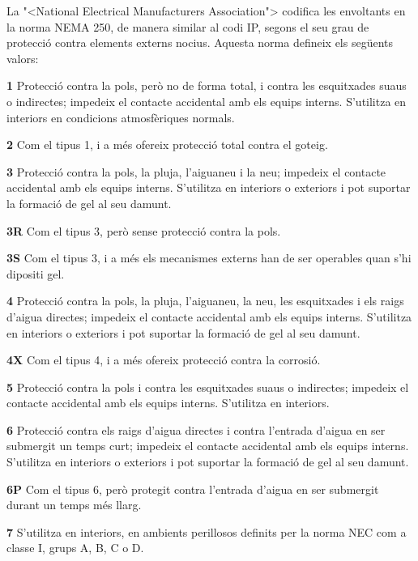 La {"<}National Electrical Manufacturers Association{">}
codifica les envoltants en la norma \textsf{NEMA 250}, de manera similar al codi \textsf{IP}, segons el seu grau de protecci\'{o} contra elements externs nocius. Aquesta norma defineix els seg\"{u}ents valors:
\begin{list}{}
   {\setlength{\labelwidth}{10mm} \setlength{\leftmargin}{10mm} \setlength{\labelsep}{2mm}}
   \item[\textbf{1}] Protecci\'{o} contra la pols, per\`{o} no de forma total, i contra les esquitxades suaus o indirectes; impedeix el contacte accidental amb els equips interns. S'utilitza en interiors en condicions atmosf\`{e}riques normals.
   \item[\textbf{2}] Com el tipus 1, i a m\'{e}s ofereix protecci\'{o} total contra el goteig.
   \item[\textbf{3}] Protecci\'{o} contra la pols, la pluja, l'aiguaneu i la neu; impedeix el contacte accidental amb els equips interns. S'utilitza en interiors o exteriors i pot suportar la formaci\'{o} de gel al seu damunt.
   \item[\textbf{3R}] Com el tipus 3, per\`{o} sense protecci\'{o} contra la pols.
   \item[\textbf{3S}] Com el tipus 3, i a m\'{e}s els mecanismes externs han de ser operables quan s'hi dipositi gel.
    \item[\textbf{4}] Protecci\'{o} contra la pols, la pluja, l'aiguaneu, la neu, les esquitxades i els raigs d'aigua directes; impedeix el contacte accidental amb els equips interns. S'utilitza en interiors o exteriors i pot suportar la formaci\'{o} de gel al seu damunt.
   \item[\textbf{4X}] Com el tipus 4, i a m\'{e}s ofereix protecci\'{o} contra la corrosi\'{o}.
   \item[\textbf{5}] Protecci\'{o} contra la pols i contra les esquitxades suaus o indirectes; impedeix el contacte accidental amb els equips interns. S'utilitza en interiors.
   \item[\textbf{6}] Protecci\'{o} contra els raigs d'aigua directes i contra l'entrada d'aigua en ser submergit un temps curt; impedeix el contacte accidental amb els equips interns. S'utilitza en interiors o exteriors i pot suportar la formaci\'{o} de gel al seu damunt.
   \item[\textbf{6P}] Com el tipus 6, per\`{o} protegit contra l'entrada d'aigua en ser submergit durant un temps m\'{e}s llarg.
   \item[\textbf{7}] S'utilitza en interiors, en ambients perillosos definits per la norma \textsf{NEC} com a classe I, grups A, B, C o D.

\end{list}
